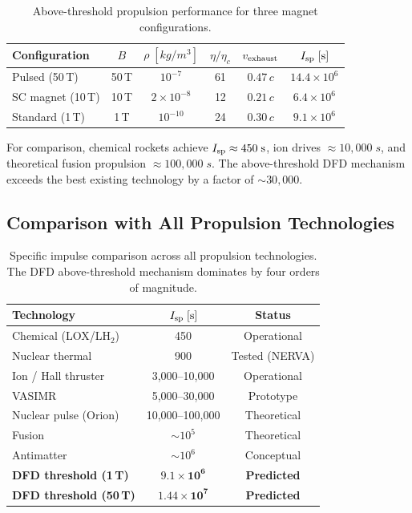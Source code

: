 \documentclass[twocolumn,prl,superscriptaddress,nofootinbib,longbibliography,floatfix]{revtex4-2}
\begin{document}
\begin{table}[h]
\centering
\caption{Above-threshold propulsion performance for three magnet configurations.}
\label{tab:threshold-performance}
\begin{ruledtabular}
\begin{tabular}{lccccc}
Configuration & $B$ & $\rho\;[\si{kg/m^3}]$ & $\eta/\eta_c$ & $v_{\rm exhaust}$ & $I_{\rm sp}\;[\si{s}]$ \\
\hline
Pulsed (50\,T) & 50\,T & $10^{-7}$ & 61 & $0.47\,c$ & $14.4 \times 10^6$ \\
SC magnet (10\,T) & 10\,T & $2\times 10^{-8}$ & 12 & $0.21\,c$ & $6.4 \times 10^6$ \\
Standard (1\,T) & 1\,T & $10^{-10}$ & 24 & $0.30\,c$ & $9.1 \times 10^6$ \\
\end{tabular}
\end{ruledtabular}
\end{table}

\noindent For comparison, chemical rockets achieve
$I_{\rm sp} \approx 450\;\si{s}$, ion drives $\approx 10{,}000\;\si{s}$,
and theoretical fusion propulsion $\approx 100{,}000\;\si{s}$.  The
above-threshold DFD mechanism exceeds the best existing technology by a
factor of $\sim\!30{,}000$.

\subsection{Comparison with All Propulsion Technologies}\label{ssec:comparison-table}

\begin{table}[h]
\centering
\caption{Specific impulse comparison across all propulsion technologies.
The DFD above-threshold mechanism dominates by four orders of magnitude.}
\label{tab:isp-comparison}
\begin{ruledtabular}
\begin{tabular}{lcc}
Technology & $I_{\rm sp}\;[\si{s}]$ & Status \\
\hline
Chemical (LOX/LH$_2$) & 450 & Operational \\
Nuclear thermal & 900 & Tested (NERVA) \\
Ion / Hall thruster & 3{,}000--10{,}000 & Operational \\
VASIMR & 5{,}000--30{,}000 & Prototype \\
Nuclear pulse (Orion) & 10{,}000--100{,}000 & Theoretical \\
Fusion & $\sim\!10^5$ & Theoretical \\
Antimatter & $\sim\!10^6$ & Conceptual \\
\textbf{DFD threshold (1\,T)} & $\mathbf{9.1 \times 10^6}$ & \textbf{Predicted} \\
\textbf{DFD threshold (50\,T)} & $\mathbf{1.44 \times 10^7}$ & \textbf{Predicted} \\
\end{tabular}
\end{ruledtabular}
\end{table}
\end{document}
